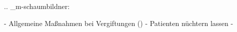 
.. _m-schaumbildner:


\begin{itemize}
    -   Allgemeine Maßnahmen bei Vergiftungen
    ()
    -   Patienten nüchtern lassen
    -   
\end{itemize}
